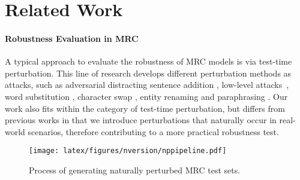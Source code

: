 \section{Related Work}
\label{sec:Related Work}

\paragraph{Robustness Evaluation in MRC} A typical approach to evaluate the robustness of MRC models is via test-time perturbation. This line of research develops different perturbation methods as attacks, such as
adversarial distracting sentence addition \citep{jia-liang-2017-adversarial, tran-etal-2023-impacts}, low-level attacks~\citep{eger-benz-2020-hero}, word substitution \citep{wu-etal-2021-evaluating}, character swap \citep{si-etal-2021-benchmarking}, entity renaming \citep{yan-etal-2022-robustness} and paraphrasing \citep{gan-ng-2019-improving, lai-etal-2021-machine, wu-etal-2023-machine}. Our work also fits within the category of test-time perturbation, but differs from previous works in that we introduce perturbations that naturally occur in real-world scenarios, therefore contributing to a more practical robustness test. 


\begin{figure*}[t!]
    \centering
    \texttt{[image: latex/figures/nversion/nppipeline.pdf]}
    \caption{Process of generating naturally perturbed MRC test sets.}
    \label{fig:rm-updated}
\end{figure*}

